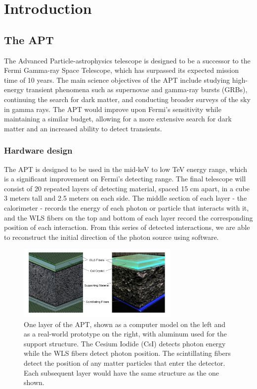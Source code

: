 \chapter{Introduction}
\label{cpt:format}


\section{The APT}

The Advanced Particle-astrophysics telescope is designed to be a successor to the Fermi Gamma-ray Space Telescope, which has surpassed its expected mission time of 10 years. The main science objectives of the APT include studying high-energy transient phenomena such as supernovae and gamma-ray bursts (GRBs), continuing the search for dark matter, and conducting broader surveys of the sky in gamma rays. The APT would improve upon Fermi's sensitivity while maintaining a similar budget, allowing for a more extensive search for dark matter and an increased ability to detect transients.

\subsection{Hardware design}

The APT is designed to be used in the mid-keV to low TeV energy range, which is a significant improvement on Fermi's detecting range. The final telescope will consist of 20 repeated layers of detecting material, spaced 15 cm apart, in a cube 3 meters tall and 2.5 meters on each side. The middle section of each layer - the calorimeter - records the energy of each photon or particle that interacts with it, and the WLS fibers on the top and bottom of each layer record the corresponding position of each interaction. From this series of detected interactions, we are able to reconstruct the initial direction of the photon source using software.

\begin{figure}
    \centering
    \includegraphics[width=0.7\textwidth]{APT_layers.png}
    \caption{One layer of the APT, shown as a computer model on the left and as a real-world prototype on the right, with aluminum used for the support structure. The Cesium Iodide (CsI) detects photon energy while the WLS fibers detect photon position. The scintillating fibers detect the position of any matter particles that enter the detector. Each subsequent layer would have the same structure as the one shown. \cite{APTmemo}}
    \label{fig:APT_layer}
\end{figure}

